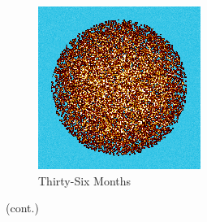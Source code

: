 \begin{figure}[H]
\begin{subfigure}{0.31\textwidth}
  \includegraphics[width=0.9\linewidth]{figures/burn-20-bstep6}
  \caption{Thirty-Six Months}
  \label{fig:bstep6}
\end{subfigure}%
%
\caption[]{(cont.)}
\label{fig:burn-meshes}
\end{figure}